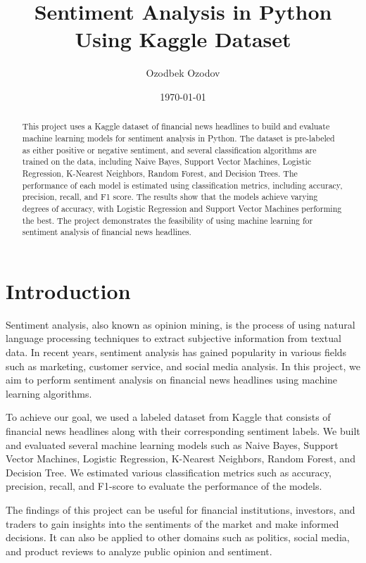 \documentclass{article}
\title{Sentiment Analysis in Python Using Kaggle Dataset}
\author{Ozodbek Ozodov}
\date{\today}
\begin{document}
\maketitle

\begin{abstract}
This project uses a Kaggle dataset of financial news headlines to build and evaluate machine learning models for 
sentiment analysis in Python. The dataset is pre-labeled as either positive or negative sentiment, and several 
classification algorithms are trained on the data, including Naive Bayes, Support Vector Machines, Logistic Regression,
K-Nearest Neighbors, Random Forest, and Decision Trees. The performance of each model is estimated using 
classification metrics, including accuracy, precision, recall, and F1 score. The results show that the models 
achieve varying degrees of accuracy, with Logistic Regression and Support Vector Machines performing the best. 
 The project demonstrates the feasibility of using machine learning for sentiment analysis of financial news headlines.
\end{abstract}

\section{Introduction}
Sentiment analysis, also known as opinion mining, is the process of using natural language processing techniques to extract subjective information from textual data. In recent years, sentiment analysis has gained popularity in various fields such as marketing, customer service, and social media analysis. In this project, we aim to perform sentiment analysis on financial news headlines using machine learning algorithms.

To achieve our goal, we used a labeled dataset from Kaggle that consists of financial news headlines along with their corresponding sentiment labels. We built and evaluated several machine learning models such as Naive Bayes, Support Vector Machines, Logistic Regression, K-Nearest Neighbors, Random Forest, and Decision Tree. We estimated various classification metrics such as accuracy, precision, recall, and F1-score to evaluate the performance of the models.

The findings of this project can be useful for financial institutions, investors, and traders to gain insights into the sentiments of the market and make informed decisions. It can also be applied to other domains such as politics, social media, and product reviews to analyze public opinion and sentiment.
\end{document}
